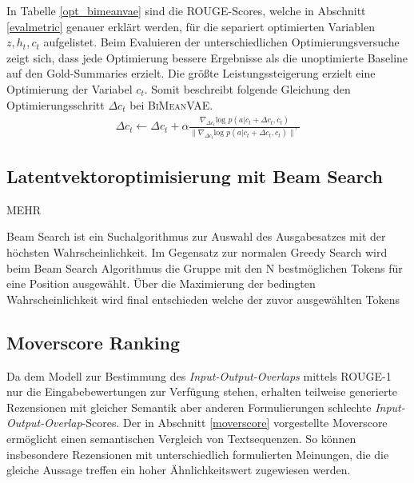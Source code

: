 In Tabelle \ref{opt_bimeanvae} sind die ROUGE-Scores, welche in Abschnitt \ref*{evalmetric} genauer erklärt werden, für die separiert optimierten Variablen $z, h_t, c_t$ aufgelistet.
Beim Evaluieren der unterschiedlichen Optimierungsversuche zeigt sich, dass jede Optimierung bessere Ergebnisse als die unoptimierte Baseline auf den Gold-Summaries erzielt.
Die größte Leistungssteigerung erzielt eine Optimierung der Variabel $c_t$.
Somit beschreibt folgende Gleichung den Optimierungsschritt $\Delta c_t$ bei \textsc{BiMeanVAE}.
\begin{align*}
    \Delta c_t \leftarrow \Delta c_t + \alpha \frac{\nabla_{\Delta c_t} \text{log }p(a|c_t+\Delta c_t,c_t)}{\| \nabla_{\Delta c_t} \text{log }p(a|c_t +\Delta c_t ,c_t )\|^\gamma}
\end{align*}




\subsection{Latentvektoroptimisierung mit Beam Search}
MEHR

Beam Search ist ein Suchalgorithmus zur Auswahl des Ausgabesatzes mit der höchsten Wahrscheinlichkeit. 
Im Gegensatz zur normalen Greedy Search wird beim Beam Search Algorithmus die Gruppe mit den N bestmöglichen Tokens für eine Position ausgewählt. 
Über die Maximierung der bedingten Wahrscheinlichkeit wird final entschieden welche der zuvor ausgewählten Tokens 

\subsection{Moverscore Ranking}
\label{moverscore_ranking}
Da dem Modell zur Bestimmung des \textit{Input-Output-Overlaps} mittels ROUGE-1 nur die Eingabebewertungen zur Verfügung stehen, erhalten teilweise generierte Rezensionen mit gleicher Semantik aber anderen Formulierungen schlechte  \textit{Input-Output-Overlap}-Scores.
Der in Abschnitt \ref{moverscore} vorgestellte Moverscore ermöglicht einen semantischen Vergleich von Textsequenzen. 
So können insbesondere Rezensionen mit unterschiedlich formulierten Meinungen, die die gleiche Aussage treffen ein hoher Ähnlichkeitswert zugewiesen werden.

